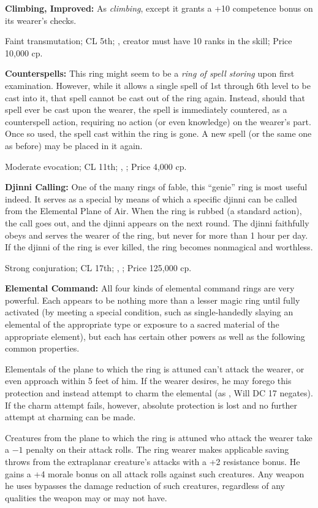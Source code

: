 \textbf{Climbing, Improved:} As \emph{climbing}, except it grants a +10 competence bonus on its wearer's  checks.

Faint transmutation; CL 5th; , creator must have 10 ranks in the  skill; Price 10,000 cp.

\textbf{Counterspells:} This ring might seem to be a \emph{ring of spell storing} upon first examination. However, while it allows a single spell of 1st through 6th level to be cast into it, that spell cannot be cast out of the ring again. Instead, should that spell ever be cast upon the wearer, the spell is immediately countered, as a counterspell action, requiring no action (or even knowledge) on the wearer's part. Once so used, the spell cast within the ring is gone. A new spell (or the same one as before) may be placed in it again.

Moderate evocation; CL 11th; , ; Price 4,000 cp.

\textbf{Djinni Calling:} One of the many rings of fable, this ``genie'' ring is most useful indeed. It serves as a special  by means of which a specific djinni can be called from the Elemental Plane of Air. When the ring is rubbed (a standard action), the call goes out, and the djinni appears on the next round. The djinni faithfully obeys and serves the wearer of the ring, but never for more than 1 hour per day. If the djinni of the ring is ever killed, the ring becomes nonmagical and worthless.

Strong conjuration; CL 17th; , ; Price 125,000 cp.

\textbf{Elemental Command:} All four kinds of elemental command rings are very powerful. Each appears to be nothing more than a lesser magic ring until fully activated (by meeting a special condition, such as single-handedly slaying an elemental of the appropriate type or exposure to a sacred material of the appropriate element), but each has certain other powers as well as the following common properties.

Elementals of the plane to which the ring is attuned can't attack the wearer, or even approach within 5 feet of him. If the wearer desires, he may forego this protection and instead attempt to charm the elemental (as , Will DC 17 negates). If the charm attempt fails, however, absolute protection is lost and no further attempt at charming can be made.

Creatures from the plane to which the ring is attuned who attack the wearer take a $-1$ penalty on their attack rolls. The ring wearer makes applicable saving throws from the extraplanar creature's attacks with a +2 resistance bonus. He gains a +4 morale bonus on all attack rolls against such creatures. Any weapon he uses bypasses the damage reduction of such creatures, regardless of any qualities the weapon may or may not have.


